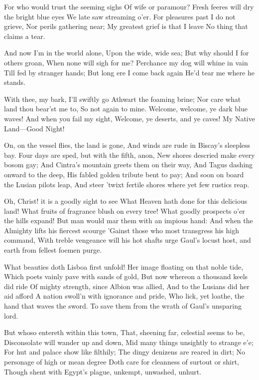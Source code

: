 \documentclass[10pt,twocolumn]{book}
\begin{document}
\begin{versus}
For who would trust the seeming sighs
   Of wife or paramour?
Fresh feeres will dry the bright blue eyes
   We late saw streaming o'er.
For pleasures past I do not grieve,
   Nor perils gathering near;
My greatest grief is that I leave
   No thing that claims a tear.

And now I'm in the world alone,
   Upon the wide, wide sea;
But why should I for others groan,
   When none will sigh for me?
Perchance my dog will whine in vain
   Till fed by stranger hands;
But long ere I come back again
   He'd tear me where he stands.

With thee, my bark, I'll swiftly go
   Athwart the foaming brine;
Nor care what land thou bear'st me to,
   So not again to mine.
Welcome, welcome, ye dark blue waves!
   And when you fail my sight,
Welcome, ye deserts, and ye caves!
   My Native Land---Good Night!

\end{versus}

   On, on the vessel flies, the land is gone,
   And winds are rude in Biscay's sleepless bay.
   Four days are sped, but with the fifth, anon,
   New shores descried make every bosom gay;
   And Cintra's mountain greets them on their way,
   And Tagus dashing onward to the deep,
   His fabled golden tribute bent to pay;
   And soon on board the Lusian pilots leap,
And steer 'twixt fertile shores where yet few rustics reap.


   Oh, Christ! it is a goodly sight to see
   What Heaven hath done for this delicious land!
   What fruits of fragrance blush on every tree!
   What goodly prospects o'er the hills expand!
   But man would mar them with an impious hand:
   And when the Almighty lifts his fiercest scourge
   'Gainst those who most transgress his high command,
   With treble vengeance will his hot shafts urge
Gaul's locust host, and earth from fellest foemen purge.

   What beauties doth Lisboa first unfold!
   Her image floating on that noble tide,
   Which poets vainly pave with sands of gold,
   But now whereon a thousand keels did ride
   Of mighty strength, since Albion was allied,
   And to the Lusians did her aid afford
   A nation swoll'n with ignorance and pride,
   Who lick, yet loathe, the hand that waves the sword.
To save them from the wrath of Gaul's unsparing lord.


   But whoso entereth within this town,
   That, sheening far, celestial seems to be,
   Disconsolate will wander up and down,
   Mid many things unsightly to strange e'e;
   For hut and palace show like filthily;
   The dingy denizens are reared in dirt;
   No personage of high or mean degree
   Doth care for cleanness of surtout or shirt,
Though shent with Egypt's plague, unkempt, unwashed, unhurt.
\end{document}
